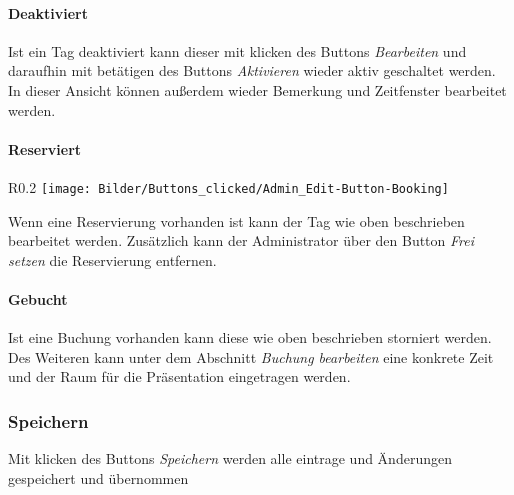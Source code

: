 \paragraph{Deaktiviert}
Ist ein Tag deaktiviert kann dieser mit klicken des Buttons \textit{Bearbeiten} und daraufhin mit betätigen des Buttons \textit{Aktivieren} wieder aktiv geschaltet werden.
In dieser Ansicht können außerdem wieder Bemerkung und Zeitfenster bearbeitet werden.
\\

\paragraph{Reserviert}
\begin{wrapfigure}{R}{0.2\textwidth}
	\centering
	\texttt{[image: Bilder/Buttons\_clicked/Admin\_Edit-Button-Booking]}
\end{wrapfigure}
Wenn eine Reservierung vorhanden ist kann der Tag wie oben beschrieben bearbeitet werden. Zusätzlich kann der Administrator über den Button \textit{Frei setzen} die Reservierung entfernen.

\paragraph{Gebucht}
Ist eine Buchung vorhanden kann diese wie oben beschrieben  storniert werden. Des Weiteren kann unter dem Abschnitt \textit{Buchung bearbeiten} eine konkrete Zeit und der Raum für die Präsentation eingetragen werden.  

\subsubsection{Speichern}
Mit klicken des Buttons \textit{Speichern} werden alle eintrage und Änderungen gespeichert und übernommen 
